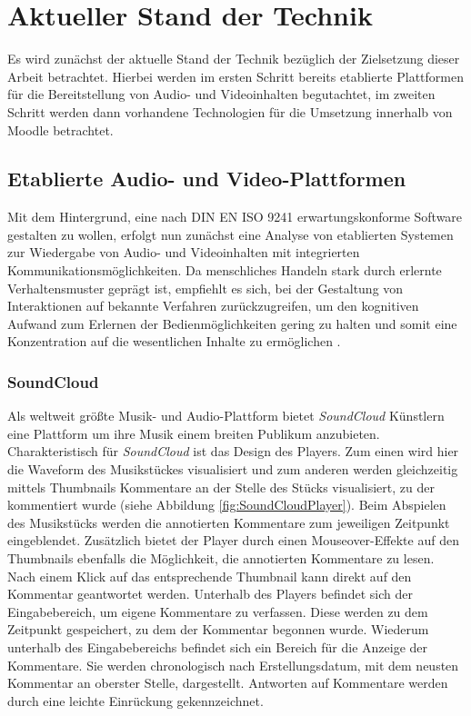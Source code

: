\section{Aktueller Stand der Technik}
Es wird zunächst der aktuelle Stand der Technik bezüglich der Zielsetzung dieser Arbeit betrachtet. Hierbei werden im ersten Schritt bereits etablierte Plattformen für die Bereitstellung von Audio- und Videoinhalten begutachtet, im zweiten Schritt werden dann vorhandene Technologien für die Umsetzung innerhalb von Moodle betrachtet.


\subsection{Etablierte Audio- und Video-Plattformen}

Mit dem Hintergrund, eine nach DIN EN ISO 9241 erwartungskonforme Software gestalten zu wollen, erfolgt nun zunächst eine Analyse von etablierten Systemen zur Wiedergabe von Audio- und Videoinhalten mit integrierten Kommunikationsmöglichkeiten. Da menschliches Handeln stark durch erlernte Verhaltensmuster geprägt ist, empfiehlt es sich, bei der Gestaltung von Interaktionen auf bekannte Verfahren zurückzugreifen, um den kognitiven Aufwand zum Erlernen der Bedienmöglichkeiten gering zu halten und somit eine Konzentration auf die wesentlichen Inhalte zu ermöglichen \citep{erwartungskonformitaet}.


\subsubsection{SoundCloud}

\glqq Als weltweit größte Musik- und Audio-Plattform\grqq{} \citep{soundcloudinfo} bietet \textit{SoundCloud} Künstlern eine Plattform um ihre Musik einem breiten Publikum anzubieten. Charakteristisch für \textit{SoundCloud} ist das Design des Players. Zum einen wird hier die Waveform des Musikstückes visualisiert und zum anderen werden gleichzeitig mittels Thumbnails Kommentare an der Stelle des Stücks visualisiert, zu der kommentiert wurde (siehe Abbildung \ref{fig:SoundCloudPlayer}). Beim Abspielen des Musikstücks werden die annotierten Kommentare zum jeweiligen Zeitpunkt eingeblendet. Zusätzlich bietet der Player durch einen Mouseover-Effekte auf den Thumbnails ebenfalls die Möglichkeit, die annotierten Kommentare zu lesen. Nach einem Klick auf das entsprechende Thumbnail kann direkt auf den Kommentar geantwortet werden. Unterhalb des Players befindet sich der Eingabebereich, um eigene Kommentare zu verfassen. Diese werden zu dem Zeitpunkt gespeichert, zu dem der Kommentar begonnen wurde. Wiederum unterhalb des Eingabebereichs befindet sich ein Bereich für die Anzeige der Kommentare. Sie werden chronologisch nach Erstellungsdatum, mit dem neusten Kommentar an oberster Stelle, dargestellt. Antworten auf Kommentare werden durch eine leichte Einrückung gekennzeichnet.

